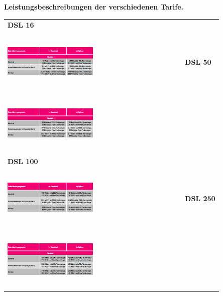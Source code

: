 \begin{table}[ht]
  {\vspace{-1.5cm}}
  \begin{center}
    \textbf{Leistungsbeschreibungen der verschiedenen Tarife.}
  \end{center}
  \begin{center}
  \label{alte Telekom Tarife}
  \begin{tabular}{>{\centering}p{} >{\centering}p{}}
        \textbf{DSL 16} \\ \includegraphics[width=0.5\textwidth, height=3cm]{./pictures/dsl16vertrag.png} & \textbf{DSL 50} \\ \includegraphics[width=0.5\textwidth, height=3cm]{./pictures/dsl50vertrag.png} \tabularnewline
        \textbf{DSL 100} \\ \includegraphics[width=0.5\textwidth, height=3cm]{./pictures/dsl100vertrag.png} & \textbf{DSL 250} \\ \includegraphics[width=0.5\textwidth, height=3cm]{./pictures/dsl250vertrag.png} \tabularnewline

\end{tabular}
\end{center}
\end{table}
